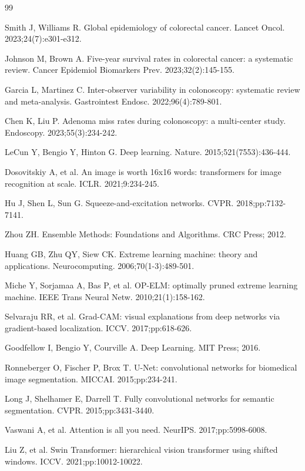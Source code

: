 \documentclass[11pt,a4paper]{article}
\begin{document}
\begin{thebibliography}{99}

 Smith J, Williams R. Global epidemiology of colorectal cancer. Lancet Oncol. 2023;24(7):e301-e312.

 Johnson M, Brown A. Five-year survival rates in colorectal cancer: a systematic review. Cancer Epidemiol Biomarkers Prev. 2023;32(2):145-155.

 Garcia L, Martinez C. Inter-observer variability in colonoscopy: systematic review and meta-analysis. Gastrointest Endosc. 2022;96(4):789-801.

 Chen K, Liu P. Adenoma miss rates during colonoscopy: a multi-center study. Endoscopy. 2023;55(3):234-242.

 LeCun Y, Bengio Y, Hinton G. Deep learning. Nature. 2015;521(7553):436-444.

 Dosovitskiy A, et al. An image is worth 16x16 words: transformers for image recognition at scale. ICLR. 2021;9:234-245.

 Hu J, Shen L, Sun G. Squeeze-and-excitation networks. CVPR. 2018;pp:7132-7141.

 Zhou ZH. Ensemble Methods: Foundations and Algorithms. CRC Press; 2012.

 Huang GB, Zhu QY, Siew CK. Extreme learning machine: theory and applications. Neurocomputing. 2006;70(1-3):489-501.

 Miche Y, Sorjamaa A, Bas P, et al. OP-ELM: optimally pruned extreme learning machine. IEEE Trans Neural Netw. 2010;21(1):158-162.

 Selvaraju RR, et al. Grad-CAM: visual explanations from deep networks via gradient-based localization. ICCV. 2017;pp:618-626.

 Goodfellow I, Bengio Y, Courville A. Deep Learning. MIT Press; 2016.

 Ronneberger O, Fischer P, Brox T. U-Net: convolutional networks for biomedical image segmentation. MICCAI. 2015;pp:234-241.

 Long J, Shelhamer E, Darrell T. Fully convolutional networks for semantic segmentation. CVPR. 2015;pp:3431-3440.

 Vaswani A, et al. Attention is all you need. NeurIPS. 2017;pp:5998-6008.

 Liu Z, et al. Swin Transformer: hierarchical vision transformer using shifted windows. ICCV. 2021;pp:10012-10022.


\end{thebibliography}
\end{document}
